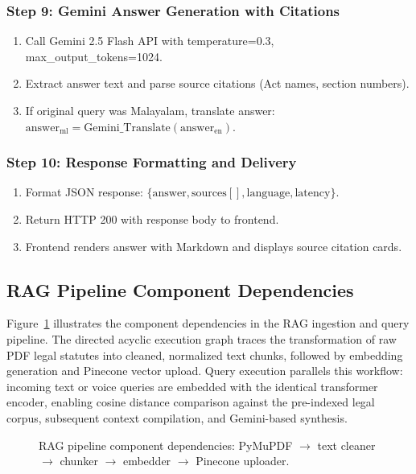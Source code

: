 \documentclass[12pt,a4paper]{report}
\begin{document}
\subsubsection*{Step 9: Gemini Answer Generation with Citations}
\begin{enumerate}
  \item[\textbf{9.1}] Call Gemini 2.5 Flash API with temperature=0.3, max\_output\_tokens=1024.
  \item[\textbf{9.2}] Extract answer text and parse source citations (Act names, section numbers).
  \item[\textbf{9.3}] If original query was Malayalam, translate answer: $\text{answer}_{\text{ml}} = \text{Gemini\_Translate}(\text{answer}_{\text{en}})$.
\end{enumerate}

\subsubsection*{Step 10: Response Formatting and Delivery}
\begin{enumerate}
  \item[\textbf{10.1}] Format JSON response: $\{\text{answer}, \text{sources}[], \text{language}, \text{latency}\}$.
  \item[\textbf{10.2}] Return HTTP 200 with response body to frontend.
  \item[\textbf{10.3}] Frontend renders answer with Markdown and displays source citation cards.
\end{enumerate}

\subsection{RAG Pipeline Component Dependencies}
Figure~\ref{fig:dag_scheduling_walkthrough} illustrates the component dependencies in the RAG ingestion and query pipeline. The directed acyclic execution graph traces the transformation of raw PDF legal statutes into cleaned, normalized text chunks, followed by embedding generation and Pinecone vector upload. Query execution parallels this workflow: incoming text or voice queries are embedded with the identical transformer encoder, enabling cosine distance comparison against the pre-indexed legal corpus, subsequent context compilation, and Gemini-based synthesis.

\begin{figure}[H]
    \centering
    \caption{RAG pipeline component dependencies: PyMuPDF $\to$ text cleaner $\to$ chunker $\to$ embedder $\to$ Pinecone uploader.}
    \label{fig:dag_scheduling_walkthrough}
\end{figure}
\end{document}
